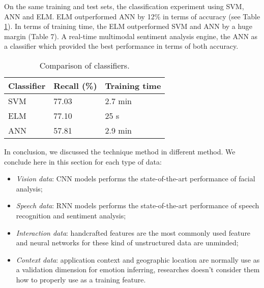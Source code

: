 On the same training and test sets, the classification
experiment using SVM, ANN and ELM. ELM outperformed ANN by
12\% in terms of accuracy (see Table \ref{tab:classifier}).
In terms of training time, the ELM outperformed SVM and ANN
by a huge margin (Table 7). A real-time multimodal sentiment analysis engine, 
the ANN as a classifier which provided the best performance in
terms of both accuracy.

\begin{table}
  \caption{Comparison of classifiers.}
  \label{tab:classifier}
  \scriptsize
  \begin{center}
    \begin{tabular}{lll}
      Classifier & Recall (\%) & Training time \\
    \hline
    SVM                   & 77.03         &  2.7 min    \\
    ELM                & 77.10         &   25 s    \\
    ANN                 & 57.81         &  2.9 min    \\
    \end{tabular}
  \end{center}
\end{table}

In conclusion, we discussed the technique method in different method. We conclude here in this section for each type of data:

\begin{itemize}
  \item \emph{Vision data}: CNN models performs the state-of-the-art performance of facial analysis;
  \item \emph{Speech data}: RNN models performs the state-of-the-art performance of speech recognition and sentiment analysis;
  \item \emph{Interaction data}: handcrafted features are the most commonly used feature and neural networks for these kind of unstructured data are unminded;
  \item  \emph{Context data}: application context and geographic location are normally use as a validation dimension for emotion inferring, researches doesn't consider them how to properly use as a training feature.
\end{itemize}